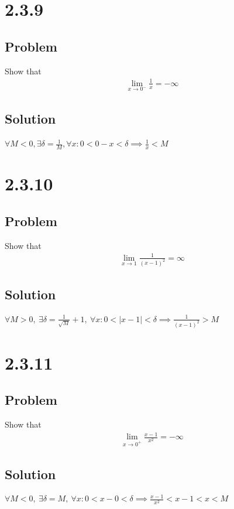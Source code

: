 \documentclass[12pt]{article}
\newcommand{\abs}  [1]{\left|       #1 \right|      }
\begin{document}
\section*{2.3.9}

\subsection*{Problem}
Show that
\begin{align*}
    \lim_{x \to 0^-} \frac{1}{x} = -\infty
\end{align*}

\subsection*{Solution}
$\forall M < 0, \exists \delta = \frac{1}{M}, \forall x : 0 < 0 - x < \delta \implies \frac{1}{x} < M$



\section*{2.3.10}

\subsection*{Problem}
Show that
\begin{align*}
    \lim_{x \to 1} \frac{1}{(x - 1)^2} = \infty
\end{align*}

\subsection*{Solution}
$\forall M > 0,\ \exists \delta = \frac{1}{\sqrt{M}} + 1,\ \forall x : 0 < \abs{x - 1} < \delta \implies \frac{1}{(x - 1)^2} > M$



\section*{2.3.11}

\subsection*{Problem}
Show that
\begin{align*}
    \lim_{x \to 0^+} \frac{x - 1}{x^2} = -\infty
\end{align*}

\subsection*{Solution}
$\forall M < 0,\ \exists \delta = M,\ \forall x : 0 < x - 0 < \delta \implies \frac{x - 1}{x^2} < x - 1 < x < M$
\end{document}
